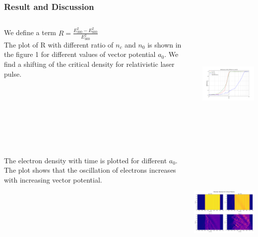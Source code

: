 \documentclass{beamer}
\begin{document}
\begin{frame}
    \frametitle{Result and Discussion}
    \small
    \begin{columns}
        \begin{column}{0.3\textwidth}
            We define a term
            $
                R= \frac{{E_{300}^2}-{E_{600}^2}}{{E_{300}^2}}
            $\\
            The plot of R with different ratio of $n_c$ and $n_0$ is shown in the figure 1 for different values of vector potential $a_0$. We find a shifting of the critical density for relativistic laser pulse.
        \end{column}
        \begin{column}{0.7\textwidth}  %
            \includegraphics[width=8cm, height=6cm]{reflection.png}
        \end{column}
    \end{columns}
\end{frame}
\begin{frame}
    \small
    \begin{columns}
        \begin{column}{0.3\textwidth}
            The electron density with time is plotted for different $a_0$. The plot shows that the oscillation of electrons increases with increasing vector potential.
        \end{column}
        \begin{column}{0.7\textwidth}  %
            \includegraphics[width=8cm, height=6cm]{density.png}
        \end{column}
    \end{columns}
\end{frame}
\end{document}
